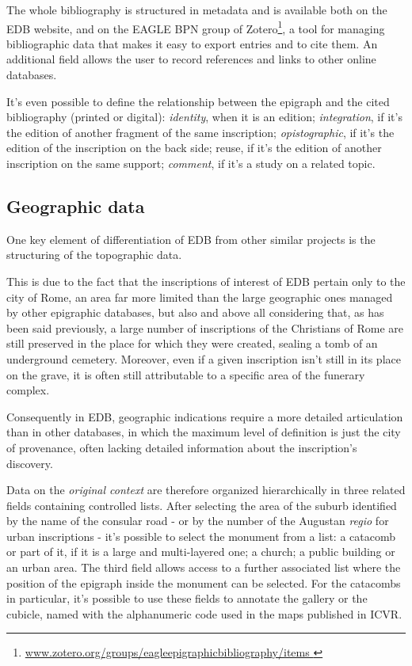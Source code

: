 \documentclass[amsthm,ebook]{saparticle}
\begin{document}
The whole bibliography is structured in metadata and is available both on the EDB website, and on the EAGLE BPN group of
Zotero\footnote{ \url{www.zotero.org/groups/eagleepigraphicbibliography/items }}, a tool for managing bibliographic data that
makes it easy to export entries and to cite them. An additional field allows the user to record references and links to
other online databases. 

It's even possible to define the relationship between the epigraph and the cited bibliography (printed or digital):
\emph{identity}, when it is an edition; \emph{integration}, if it's the edition of another fragment of the same inscription;
\emph{opistographic}, if it's the edition of the inscription on the back side; reuse, if it's the edition of another
inscription on the same support; \emph{comment}, if it's a study on a related topic.




\subsection{Geographic data}


One key element of differentiation of EDB from other similar projects is the structuring of the topographic data. 

This is due to the fact that the inscriptions of interest of EDB pertain only to the city of Rome, an area far more
limited than the large geographic ones managed by other epigraphic databases, but also and above all considering that,
as has been said previously, a large number of inscriptions of the Christians of Rome are still preserved in the place
for which they were created, sealing a tomb of an underground cemetery. Moreover, even if a given inscription isn't
still in its place on the grave, it is often still attributable to a specific area of the funerary complex.

Consequently in EDB, geographic indications require a more detailed articulation than in other databases, in which the
maximum level of definition is just the city of provenance, often lacking detailed information about the inscription’s
discovery.

Data on the \emph{original context} are therefore organized hierarchically in three related fields containing controlled lists.
After selecting the area of the suburb identified by the name of the consular road - or by the number of the Augustan
\emph{regio} for urban inscriptions - it's possible to select the monument from a list: a catacomb or part of it, if it is a
large and multi-layered one; a church; a public building or an urban area. The third field allows access to a further
associated list where the position of the epigraph inside the monument can be selected. For the catacombs in
particular, it’s possible to use these fields to annotate the gallery or the cubicle, named with the alphanumeric code
used in the maps published in ICVR.
\end{document}
